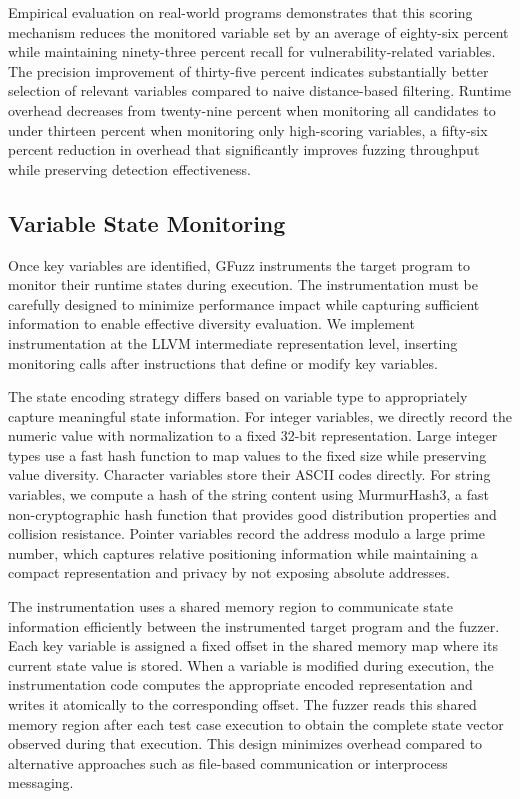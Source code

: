 \documentclass[review]{elsarticle}
\begin{document}
Empirical evaluation on real-world programs demonstrates that this scoring mechanism reduces the monitored variable set by an average of eighty-six percent while maintaining ninety-three percent recall for vulnerability-related variables. The precision improvement of thirty-five percent indicates substantially better selection of relevant variables compared to naive distance-based filtering. Runtime overhead decreases from twenty-nine percent when monitoring all candidates to under thirteen percent when monitoring only high-scoring variables, a fifty-six percent reduction in overhead that significantly improves fuzzing throughput while preserving detection effectiveness.

\subsection{Variable State Monitoring}

Once key variables are identified, GFuzz instruments the target program to monitor their runtime states during execution. The instrumentation must be carefully designed to minimize performance impact while capturing sufficient information to enable effective diversity evaluation. We implement instrumentation at the LLVM intermediate representation level, inserting monitoring calls after instructions that define or modify key variables.

The state encoding strategy differs based on variable type to appropriately capture meaningful state information. For integer variables, we directly record the numeric value with normalization to a fixed 32-bit representation. Large integer types use a fast hash function to map values to the fixed size while preserving value diversity. Character variables store their ASCII codes directly. For string variables, we compute a hash of the string content using MurmurHash3, a fast non-cryptographic hash function that provides good distribution properties and collision resistance. Pointer variables record the address modulo a large prime number, which captures relative positioning information while maintaining a compact representation and privacy by not exposing absolute addresses.

The instrumentation uses a shared memory region to communicate state information efficiently between the instrumented target program and the fuzzer. Each key variable is assigned a fixed offset in the shared memory map where its current state value is stored. When a variable is modified during execution, the instrumentation code computes the appropriate encoded representation and writes it atomically to the corresponding offset. The fuzzer reads this shared memory region after each test case execution to obtain the complete state vector observed during that execution. This design minimizes overhead compared to alternative approaches such as file-based communication or interprocess messaging.
\end{document}
